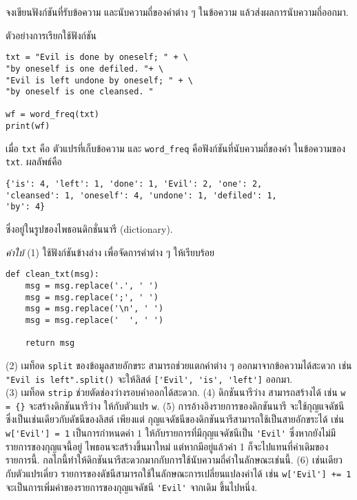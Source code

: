 \begin{Exercise}
\label{prog dic word freq}
จงเขียนฟังก์ชันที่รับข้อความ และนับความถี่ของคำต่าง ๆ ในข้อความ แล้วส่งผลการนับความถี่ออกมา.

ตัวอย่างการเรียกใช้ฟังก์ชัน
\begin{verbatim}
txt = "Evil is done by oneself; " + \
"by oneself is one defiled. "+ \
"Evil is left undone by oneself; " + \
"by oneself is one cleansed. "

wf = word_freq(txt)
print(wf)
\end{verbatim}
เมื่อ \verb|txt| คือ ตัวแปรที่เก็บข้อความ
และ \verb|word_freq| คือฟังก์ชันที่นับความถี่ของคำ ในข้อความของ \verb|txt|.
ผลลัพธ์คือ
\begin{verbatim}
{'is': 4, 'left': 1, 'done': 1, 'Evil': 2, 'one': 2, 
'cleansed': 1, 'oneself': 4, 'undone': 1, 'defiled': 1, 
'by': 4}
\end{verbatim}
ซึ่งอยู่ในรูปของไพธอนดิกชั่นนารี (dictionary).

\textit{คำใบ้}
(1) ใช้ฟังก์ชันข้างล่าง เพื่อจัดการคำต่าง ๆ ให้เรียบร้อย
\begin{verbatim}
def clean_txt(msg):
    msg = msg.replace('.', ' ')
    msg = msg.replace(';', ' ')
    msg = msg.replace('\n', ' ')
    msg = msg.replace('  ', ' ')

    return msg
\end{verbatim}
(2) เมท็อด \verb|split| ของข้อมูลสายอักขระ 
สามารถช่วยแตกคำต่าง ๆ ออกมาจากข้อความได้สะดวก เช่น
\verb|"Evil is left".split()| จะให้ลิสต์
\verb|['Evil', 'is', 'left']| ออกมา.\\
(3) เมท็อด \verb|strip| 
ช่วยตัดช่องว่างรอบคำออกได้สะดวก.
(4) ดิกชันนารีว่าง สามารถสร้างได้ เช่น \verb|w = {}| จะสร้างดิกชันนารีว่าง ให้กับตัวแปร \verb|w|.
(5) การอ้างอิงรายการของดิกชันนารี จะใช้กุญแจดัชนี ซึ่งเป็นเช่นเดียวกับดัชนีของลิสต์ เพียงแต่ กุญแจดัชนีของดิกชันนารีสามารถใช้เป็นสายอักขระได้ เช่น \verb|w['Evil'] = 1| เป็นการกำหนดค่า $1$ ให้กับรายการที่มีกุญแจดัชนีเป็น \verb|'Evil'| ซึ่งหากยังไม่มีรายการของกุญแจนี้อยู่ ไพธอนจะสร้างขึ้นมาใหม่ แต่หากมีอยู่แล้วค่า 1 ก็จะไปแทนที่ค่าเดิมของรายการนี้.
กลไกนี้ทำให้ดิกชันนารีสะดวกมากกับการใช้นับความถี่คำในลักษณะเช่นนี้.
(6) เช่นเดียวกับตัวแปรเดี่ยว รายการของดัชนีสามารถใช้ในลักษณะการเปลี่ยนแปลงค่าได้ เช่น \verb|w['Evil'] += 1| จะเป็นการเพิ่มค่าของรายการของกุญแจดัชนี \verb|'Evil'| จากเดิม ขึ้นไปหนึ่ง.
\end{Exercise}


